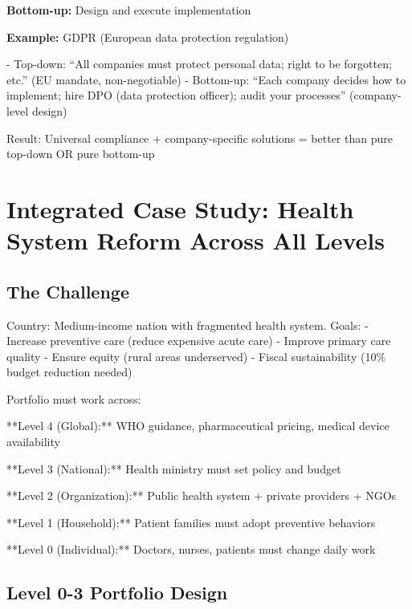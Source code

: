 \textbf{Bottom-up:} Design and execute implementation

\textbf{Example:} GDPR (European data protection regulation)

- Top-down: ``All companies must protect personal data; right to be forgotten; etc.'' (EU mandate, non-negotiable)
- Bottom-up: ``Each company decides how to implement; hire DPO (data protection officer); audit your processes'' (company-level design)

Result: Universal compliance + company-specific solutions = better than pure top-down OR pure bottom-up


\section{Integrated Case Study: Health System Reform Across All Levels}
\label{sec:case-study-health}

\subsection{The Challenge}

Country: Medium-income nation with fragmented health system. Goals:
- Increase preventive care (reduce expensive acute care)
- Improve primary care quality
- Ensure equity (rural areas underserved)
- Fiscal sustainability (10\% budget reduction needed)

Portfolio must work across:

**Level 4 (Global):** WHO guidance, pharmaceutical pricing, medical device availability

**Level 3 (National):** Health ministry must set policy and budget

**Level 2 (Organization):** Public health system + private providers + NGOs

**Level 1 (Household):** Patient families must adopt preventive behaviors

**Level 0 (Individual):** Doctors, nurses, patients must change daily work

\subsection{Level 0-3 Portfolio Design}

